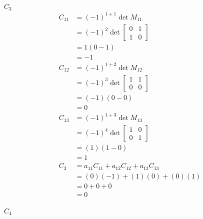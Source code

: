 \documentclass[main.tex]{subfiles}
\begin{document}
\begin{enumerate}
\begin{enumerate}
        $C_{3}$
        $$
        \begin{aligned}
        C_{11} &=(-1)^{1+1} \operatorname{det} M_{11} \\
        &=(-1)^{2} \operatorname{det}\left[\begin{array}{ll}
        0 & 1 \\
        1 & 0
        \end{array}\right] \\
        &=1(0-1) \\
        &=-1 \\
        C_{12} &=(-1)^{1+2} \operatorname{det} M_{12} \\
        &=(-1)^{3} \operatorname{det}\left[\begin{array}{ll}
        1 & 1 \\
        0 & 0
        \end{array}\right] \\
        &=(-1)(0-0) \\
        &=0 \\
        C_{13} &=(-1)^{1+3} \operatorname{det} M_{13} \\
        &=(-1)^{4} \operatorname{det}\left[\begin{array}{ll}
        1 & 0 \\
        0 & 1
        \end{array}\right] \\
        &=(1)(1-0) \\
        &=1 \\
        C_{3} &= a_{11} C_{11}+a_{12} C_{12}+a_{13} C_{13} \\
        &=(0)(-1)+(1)(0)+(0)(1) \\
        &=0 +0+0 \\
        & =0 \\
        \end{aligned}
        $$
        
        $C_{4}$
        

\end{enumerate}
\end{enumerate}
\end{document}
